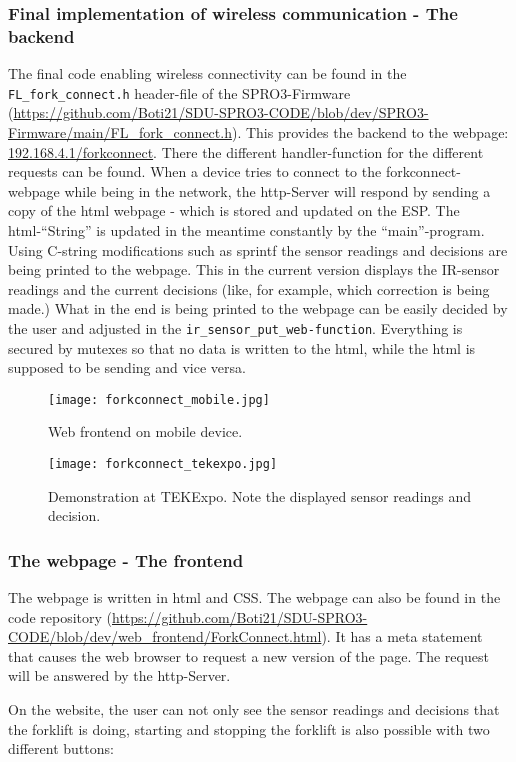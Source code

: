 \documentclass[../report.tex]{subfiles}
\begin{document}
\subsubsection{Final implementation of wireless communication - The backend}
The final code enabling wireless connectivity can be found in the 
\texttt{FL\_fork\_connect.h} header-file of the SPRO3-Firmware (\url{https://github.com/Boti21/SDU-SPRO3-CODE/blob/dev/SPRO3-Firmware/main/FL_fork_connect.h}).
This provides the backend to the webpage: \url{192.168.4.1/forkconnect}.
There the different handler-function for the different requests can be found.
When a device tries to connect to the forkconnect-webpage while being in the network,
the http-Server will respond by sending a copy of the html webpage - which is stored and updated on the ESP. The html-``String'' is updated in the 
meantime constantly by the ``main''-program. Using C-string modifications such as sprintf the sensor readings
and decisions are being printed to the webpage. This in the current version displays the IR-sensor readings
and the current decisions (like, for example, which correction is being made.) What in the end is being 
printed to the webpage can be easily decided by the user and adjusted in the \texttt{ir\_sensor\_put\_web-function}.
Everything is secured by mutexes so that no data is written to the html, while the html is supposed
to be sending and vice versa. 
\begin{figure}[H]
    \centering
    \texttt{[image: forkconnect\_mobile.jpg]}
    \caption{Web frontend on mobile device.}
    
\end{figure} 
\begin{figure}[H]
    \centering
    \texttt{[image: forkconnect\_tekexpo.jpg]}
    \caption{Demonstration at TEKExpo. Note the displayed sensor readings and decision.}
\end{figure} 
\subsubsection{The webpage - The frontend}
The webpage is written in html and CSS. The webpage can also be found in the code 
repository (\url{https://github.com/Boti21/SDU-SPRO3-CODE/blob/dev/web_frontend/ForkConnect.html}).
It has a meta statement that causes the web browser to request a new version of the page.
The request will be answered by the http-Server. 

On the website, the user can not only see the sensor readings and decisions that the forklift is doing,
starting and stopping the forklift is also possible with two different buttons: 
\end{document}
